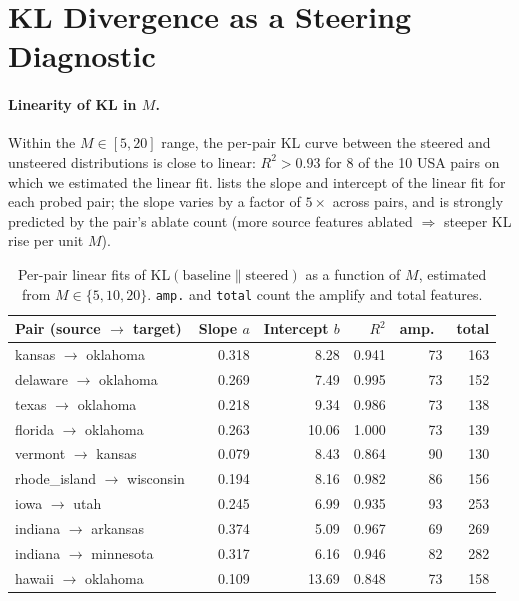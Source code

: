 \section{KL Divergence as a Steering Diagnostic}
\label{appx:kl}

\paragraph{Linearity of KL in $M$.}
Within the $M \in [5, 20]$ range, the per-pair KL curve between the steered and unsteered distributions is close to linear: $R^2 > 0.93$ for 8 of the 10 USA pairs on which we estimated the linear fit.  lists the slope and intercept of the linear fit for each probed pair; the slope varies by a factor of $5\times$ across pairs, and is strongly predicted by the pair's ablate count (more source features ablated $\Rightarrow$ steeper KL rise per unit $M$).

\begin{table}[h]
\centering\small
\begin{tabular}{lrrrrr}
\toprule
Pair (source $\to$ target) & Slope $a$ & Intercept $b$ & $R^2$ & amp.\ & total \\
\midrule
kansas $\to$ oklahoma       & 0.318 &  8.28 & 0.941 & 73 & 163 \\
delaware $\to$ oklahoma     & 0.269 &  7.49 & 0.995 & 73 & 152 \\
texas $\to$ oklahoma        & 0.218 &  9.34 & 0.986 & 73 & 138 \\
florida $\to$ oklahoma      & 0.263 & 10.06 & 1.000 & 73 & 139 \\
vermont $\to$ kansas        & 0.079 &  8.43 & 0.864 & 90 & 130 \\
rhode\_island $\to$ wisconsin & 0.194 &  8.16 & 0.982 & 86 & 156 \\
iowa $\to$ utah             & 0.245 &  6.99 & 0.935 & 93 & 253 \\
indiana $\to$ arkansas      & 0.374 &  5.09 & 0.967 & 69 & 269 \\
indiana $\to$ minnesota     & 0.317 &  6.16 & 0.946 & 82 & 282 \\
hawaii $\to$ oklahoma       & 0.109 & 13.69 & 0.848 & 73 & 158 \\
\bottomrule
\end{tabular}
\caption{Per-pair linear fits of KL$(\mathrm{baseline} \parallel \mathrm{steered})$ as a function of $M$, estimated from $M \in \{5, 10, 20\}$. \texttt{amp.} and \texttt{total} count the amplify and total features.}
\label{tab:kl-pairs}
\end{table}

